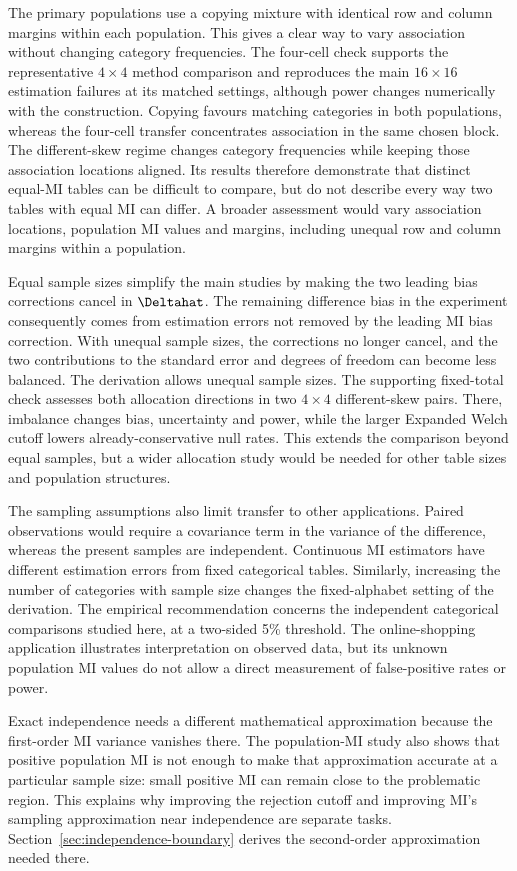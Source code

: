 The primary populations use a copying mixture with identical row and
column margins within each population. This gives a clear way to vary
association without changing category frequencies. The four-cell check
supports the representative \(4\times4\) method comparison and
reproduces the main \(16\times16\) estimation failures at its matched
settings, although power changes numerically with the construction.
Copying favours matching categories in both
populations, whereas the four-cell transfer concentrates association
in the same chosen block. The different-skew regime changes category
frequencies while keeping those association locations aligned. Its
results therefore demonstrate that distinct equal-MI tables can be
difficult to compare, but do not describe every way two tables with
equal MI can differ. A broader assessment would vary association
locations, population MI values and margins, including unequal
row and column margins within a population.

Equal sample sizes simplify the main studies by making the two leading
bias corrections cancel in \(\Deltahat\). The remaining difference
bias in the experiment consequently comes from estimation errors not
removed by the leading MI bias correction. With unequal sample sizes, the
corrections no longer cancel, and the two contributions to the standard
error and degrees of freedom can become less balanced. The derivation
allows unequal sample sizes. The supporting fixed-total check assesses
both allocation directions in two \(4\times4\) different-skew pairs.
There, imbalance changes bias, uncertainty and power, while the
larger Expanded Welch cutoff lowers already-conservative null rates.
This extends the comparison beyond equal samples, but a wider allocation
study would be needed for other table sizes and population structures.

The sampling assumptions also limit transfer to other applications.
Paired observations would require a covariance term in the variance of
the difference, whereas the present samples are independent. Continuous
MI estimators have different estimation errors from fixed categorical
tables. Similarly, increasing the number of categories with sample size
changes the fixed-alphabet setting of the derivation. The empirical
recommendation concerns the independent categorical comparisons studied
here, at a two-sided 5\% threshold. The online-shopping application
illustrates interpretation on observed data, but its unknown population
MI values do not allow a direct measurement of false-positive rates or power.

Exact independence needs a different mathematical approximation because
the first-order MI variance vanishes there. The population-MI
study also shows that positive population MI is not enough to make that
approximation accurate at a particular sample size: small positive MI
can remain close to the problematic region. This explains why improving
the rejection cutoff and improving MI's sampling approximation near independence
are separate tasks.
Section~\ref{sec:independence-boundary} derives the second-order
approximation needed there.
